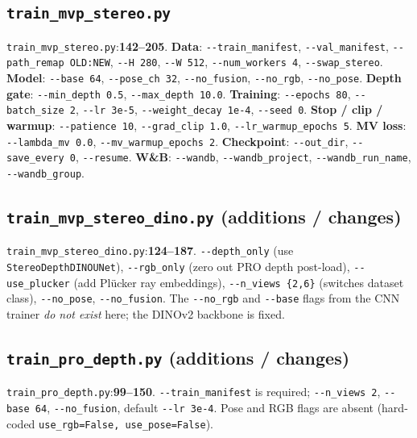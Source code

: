 \documentclass[11pt]{article}
\newcommand{\fref}[2]{\texttt{\textcolor{filegray}{#1}}:\textbf{#2}}
\begin{document}
\subsection{\texttt{train\_mvp\_stereo.py}}
\fref{train\_mvp\_stereo.py}{142--205}.
\textbf{Data}:
\texttt{-{}-train\_manifest}, \texttt{-{}-val\_manifest},
\texttt{-{}-path\_remap OLD:NEW}, \texttt{-{}-H 280}, \texttt{-{}-W 512},
\texttt{-{}-num\_workers 4}, \texttt{-{}-swap\_stereo}.
\textbf{Model}: \texttt{-{}-base 64}, \texttt{-{}-pose\_ch 32},
\texttt{-{}-no\_fusion}, \texttt{-{}-no\_rgb}, \texttt{-{}-no\_pose}.
\textbf{Depth gate}: \texttt{-{}-min\_depth 0.5},
\texttt{-{}-max\_depth 10.0}.
\textbf{Training}: \texttt{-{}-epochs 80},
\texttt{-{}-batch\_size 2}, \texttt{-{}-lr 3e-5},
\texttt{-{}-weight\_decay 1e-4}, \texttt{-{}-seed 0}.
\textbf{Stop / clip / warmup}: \texttt{-{}-patience 10},
\texttt{-{}-grad\_clip 1.0}, \texttt{-{}-lr\_warmup\_epochs 5}.
\textbf{MV loss}: \texttt{-{}-lambda\_mv 0.0},
\texttt{-{}-mv\_warmup\_epochs 2}.
\textbf{Checkpoint}: \texttt{-{}-out\_dir},
\texttt{-{}-save\_every 0}, \texttt{-{}-resume}.
\textbf{W\&B}: \texttt{-{}-wandb}, \texttt{-{}-wandb\_project},
\texttt{-{}-wandb\_run\_name}, \texttt{-{}-wandb\_group}.

\subsection{\texttt{train\_mvp\_stereo\_dino.py} (additions / changes)}
\fref{train\_mvp\_stereo\_dino.py}{124--187}.
\texttt{-{}-depth\_only} (use \texttt{StereoDepthDINOUNet}),
\texttt{-{}-rgb\_only} (zero out PRO depth post-load),
\texttt{-{}-use\_plucker} (add Plücker ray embeddings),
\texttt{-{}-n\_views \{2,6\}} (switches dataset class),
\texttt{-{}-no\_pose}, \texttt{-{}-no\_fusion}.
The \texttt{-{}-no\_rgb} and \texttt{-{}-base} flags from the CNN trainer
\emph{do not exist} here; the DINOv2 backbone is fixed.

\subsection{\texttt{train\_pro\_depth.py} (additions / changes)}
\fref{train\_pro\_depth.py}{99--150}.
\texttt{-{}-train\_manifest} is required;
\texttt{-{}-n\_views 2}, \texttt{-{}-base 64},
\texttt{-{}-no\_fusion}, default \texttt{-{}-lr 3e-4}. Pose and RGB
flags are absent (hard-coded \texttt{use\_rgb=False,
use\_pose=False}).

\end{document}
